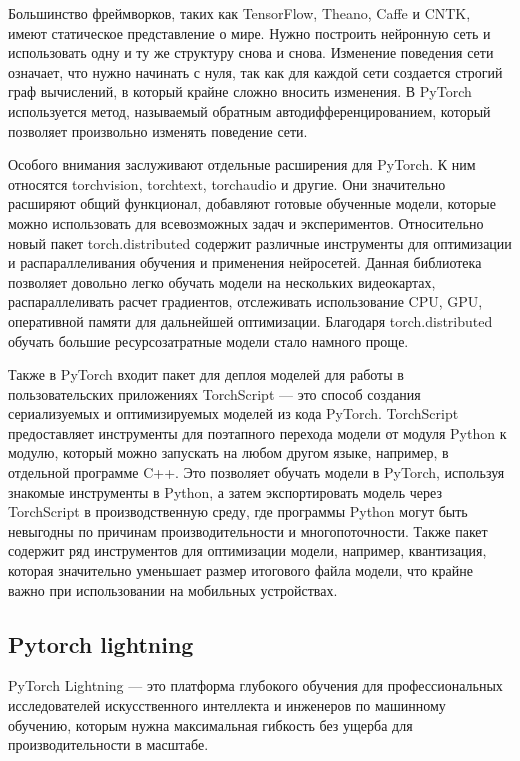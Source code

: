 Большинство фреймворков, таких как TensorFlow, Theano, Caffe и CNTK, имеют статическое представление о мире. Нужно построить нейронную сеть и использовать одну и ту же структуру снова и снова. Изменение поведения сети означает, что нужно начинать с нуля, так как для каждой сети создается строгий граф вычислений, в который крайне сложно вносить изменения.
В PyTorch используется метод, называемый обратным автодифференцированием, который позволяет произвольно изменять поведение сети. ~\cite{pytorch_github}

Особого внимания заслуживают отдельные расширения для PyTorch. К ним относятся torchvision, torchtext, torchaudio и другие. Они значительно расширяют общий функционал, добавляют готовые обученные модели, которые можно использовать для всевозможных задач и экспериментов. Относительно новый пакет torch.distributed содержит различные инструменты для оптимизации и распараллеливания обучения и применения нейросетей. Данная библиотека позволяет довольно легко обучать модели на нескольких видеокартах, распараллеливать расчет градиентов, отслеживать использование CPU, GPU, оперативной памяти для дальнейшей оптимизации. Благодаря torch.distributed обучать большие ресурсозатратные модели стало намного проще.

Также в PyTorch входит пакет для деплоя моделей для работы в пользовательских приложениях TorchScript — это способ создания сериализуемых и оптимизируемых моделей из кода PyTorch. TorchScript предоставляет инструменты для поэтапного перехода модели от модуля Python к модулю, который можно запускать на любом другом языке, например, в отдельной программе C++. Это позволяет обучать модели в PyTorch, используя знакомые инструменты в Python, а затем экспортировать модель через TorchScript в производственную среду, где программы Python могут быть невыгодны по причинам производительности и многопоточности. Также пакет содержит ряд инструментов для оптимизации модели, например, квантизация, которая значительно уменьшает размер итогового файла модели, что крайне важно при использовании на мобильных устройствах.

\subsection{Pytorch lightning}

PyTorch Lightning --- это платформа глубокого обучения для профессиональных исследователей искусственного интеллекта и инженеров по машинному обучению, которым нужна максимальная гибкость без ущерба для производительности в масштабе.


